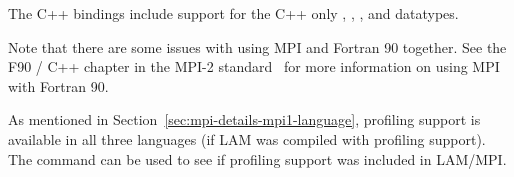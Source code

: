 The C++ bindings include support for the C++ only ,
, , and
 datatypes.

Note that there are some issues with using MPI and Fortran 90
together.  See the F90 / C++ chapter in the MPI-2
standard~\cite{geist96:_mpi2_lyon} for more information on using MPI
with Fortran 90.

As mentioned in Section~\ref{sec:mpi-details-mpi1-language}, profiling
support is available in all three languages (if LAM was compiled with
profiling support).  The  command can be used to see if
profiling support was included in LAM/MPI.
